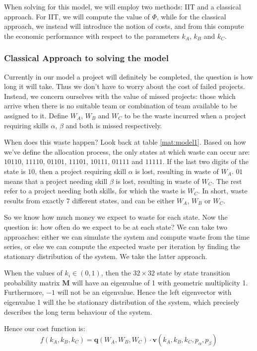 When solving for this model, we will employ two methods: IIT and a classical approach. For IIT, we will compute the value of $\Phi$, while for the classical approach, we instead will introduce the notion of costs, and from this compute the economic performance with respect to the parameters $k_A$, $k_B$ and $k_C$. 

\subsubsection{Classical Approach to solving the model}
Currently in our model a project will definitely be completed, the question is how long it will take. Thus we don't have to worry about the cost of failed projects. Instead, we concern ourselves with the value of missed projects: those which arrive when there is no suitable team or combination of team available to be assigned to it. Define $W_A$, $W_B$ and $W_C$ to be the waste incurred when a project requiring skills $\alpha$, $\beta$ and both  is missed respectively.

When does this waste happen? Look back at table \ref{mat:model1}. Based on how we've define the allocation process, the only states at which waste can occur are: $10110$, $11110$, $01101$, $11101$, $10111$, $01111$ and $11111$. If the last two digits of the state is $10$, then a project requiring skill $\alpha$ is lost, resulting in waste of $W_A$. $01$ means that a project needing skill $\beta$ is lost, resulting in waste of $W_C$. The rest refer to a project needing both skills, for which the waste is $W_C$. In short, waste results from exactly 7 different states, and can be either $W_A$, $W_B$ or $W_C$.

So we know how much money we expect to waste for each state. Now the question is: how often do we expect to be at each state? We can take two approaches: either we can simulate the system and compute waste from the time series, or else we can compute the expected waste per iteration by finding the stationary distribution of the system. We take the latter approach.

When the values of $k_i \in (0,1)$, then the $32\times32$ state by state transition probability matrix $\mathbf{M}$ will have an eigenvalue of 1 with geometric multiplicity 1. Furthermore, $-1$ will not be an eigenvalue. Hence the left eigenvector with eigenvalue 1 will the be stationary distribution of the system, which precisely describes the long term behaviour of the system. 

Hence our cost function is:
\begin{equation}
\label{eq:simple_model_cost_function}
f(k_A, k_B, k_C) = \mathbf{q}(W_A, W_B, W_C) \cdot \mathbf{v}(k_A, k_B, k_C, p_\alpha, p_\beta)
\end{equation}

